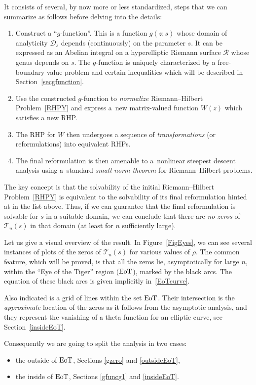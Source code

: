 \documentclass[10pt,a4paper]{amsart}
\numberwithin{equation}{section}
\theoremstyle{definition}
\def \scr{\mathscr}
\begin{document}
It consists of several, by now more or less standardized, steps that we can summarize as follows before delving into the details:
\begin{enumerate}\itemsep=0pt
\item[(1)] Construct a ``$g$-function''. This is a function $g(z;s)$ whose domain of analyticity $\scr D_s$ depends (continuously) on the parameter $s$. It can be expressed as an Abelian integral on a hyperelliptic Riemann surface $\mathcal R$ whose genus depends on $s$. The $g$-function is uniquely characterized by a free-boundary value problem and certain inequalities which will be described in Section~\ref{secgfunction}.
\item[(2)] Use the constructed $g$-function to {\it normalize} Riemann--Hilbert Problem~\ref{RHPY} and express a~new matrix-valued function $W(z)$ which satisfies a new RHP.
\item[(3)] The RHP for $W$ then undergoes a sequence of {\it transformations} (or reformulations) into equivalent RHPs.
\item[(4)] The final reformulation is then amenable to a~nonlinear steepest descent analysis using a~standard {\it small norm theorem} for Riemann--Hilbert problems.
\end{enumerate}
The key concept is that the solvability of the initial Riemann--Hilbert Problem~\ref{RHPY} is equivalent to the solvability of its final reformulation hinted at in the list above.
Thus, if we can guarantee that the final reformulation is solvable for $s$ in a suitable domain, we can conclude that there are {\it no zeros} of~$\mathcal T_n(s)$ in that domain (at least for $n$ sufficiently large).

Let us give a visual overview of the result. In Figure~\ref{FigEyes}, we can see several instances of plots of the zeros of $\mathcal T_n(s)$ for various values of ${ {\rho}}$. The common feature, which will be proved, is that all the zeros lie, asymptotically for large $n$, within the ``Eye of the Tiger'' region (${\rm EoT}$), marked by the black arcs. The equation of these black arcs is given implicitly in~\eqref{EoTcurve}.

Also indicated is a grid of lines within the set ${\rm EoT}$. Their intersection is the {\it approximate} location of the zeros as it follows from the asymptotic analysis, and they represent the vanishing of a theta function for an elliptic curve, see Section~\ref{insideEoT}.

Consequently we are going to split the analysis in two cases:
\begin{itemize}\itemsep=0pt
\item the outside of ${\rm EoT}$, Sections \ref{gzero} and \ref{outsideEoT},
\item the inside of ${\rm EoT}$, Sections \ref{gfuncg1} and \ref{insideEoT}.
\end{itemize}
\end{document}
